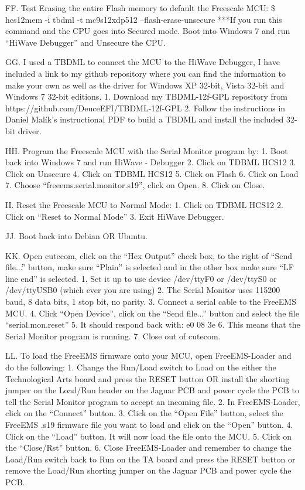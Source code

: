\documentclass[12pt,notitlepage,onecolumn,oneside,openany]{memoir}
\begin{document}
FF. Test Erasing the entire Flash memory to default the Freescale MCU:
      \$ hcs12mem -i tbdml -t mc9s12xdp512 –flash-erase-unsecure
***If you run this command and the CPU goes into Secured mode.  Boot into Windows 7 and run “HiWave Debugger” and Unsecure the CPU. 

GG. I used a TBDML to connect the MCU to the HiWave Debugger, I have included a link to my github repository where you can find the information to make your own as well as the driver for Windows XP 32-bit, Vista 32-bit and Windows 7 32-bit editions.
1. Download my TBDML-12f-GPL repository from https://github.com/DeuceEFI/TBDML-12f-GPL
2. Follow the instructions in Daniel Malík's instructional PDF to build a TBDML and install the included 32-bit driver.

HH. Program the Freescale MCU with the Serial Monitor program by:
1. Boot back into Windows 7 and run HiWave - Debugger
2. Click on TDBML HCS12
3. Click on Unsecure
4. Click on TDBML HCS12
5. Click on Flash
6. Click on Load
7. Choose “freeems.serial.monitor.s19”, click on Open. 
8. Click on Close.

II. Reset the Freescale MCU to Normal Mode:
1. Click on TDBML HCS12
2. Click on “Reset to Normal Mode”
3. Exit HiWave Debugger.

JJ. Boot back into Debian OR Ubuntu.

KK. Open cutecom, click on the “Hex Output” check box, to the right of “Send file...” button, make sure “Plain” is selected and in the other box make sure “LF line end” is selected.
1. Set it up to use device /dev/ttyF0 or /dev/ttyS0 or /dev/ttyUSB0 (which ever you are using)
2. The Serial Monitor uses 115200 baud, 8 data bits, 1 stop bit, no parity.
3. Connect a serial cable to the FreeEMS MCU.
4. Click “Open Device”, click on the “Send file...” button and select the file “serial.mon.reset”
5. It should respond back with: e0 08 3e
6. This means that the Serial Monitor program is running.  
7. Close out of cutecom.

LL. To load the FreeEMS firmware onto your MCU, open FreeEMS-Loader and do the following:
1. Change the Run/Load switch to Load on the either the Technological Arts board and press the RESET button OR install the shorting jumper on the Load/Run header on the Jaguar PCB and power cycle the PCB to tell the Serial Monitor program to accept an incoming file. 
2. In FreeEMS-Loader, click on the “Connect” button.
3. Click on the “Open File” button, select the FreeEMS .s19 firmware file you want to load and click on the “Open” button.
4. Click on the “Load” button.  It will now load the file onto the MCU.
5. Click on the “Close/Rst” button.
6. Close FreeEMS-Loader and remember to change the Load/Run switch back to Run on the TA board and press the RESET button or remove the Load/Run shorting jumper on the Jaguar PCB and power cycle the PCB.
\end{document}
